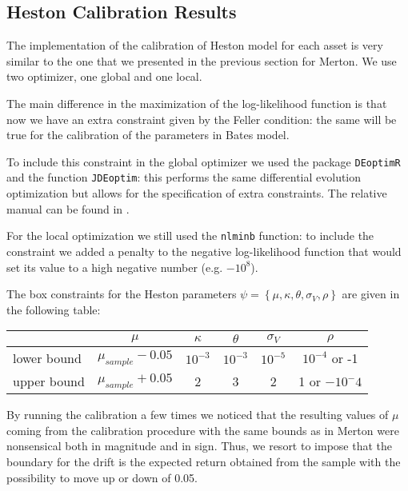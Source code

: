 \subsection{Heston Calibration Results}

The implementation of the calibration of Heston model for each asset is very similar to the one that we presented in the previous section for Merton. We use two optimizer, one global and one local.

The main difference in the maximization of the log-likelihood function is that now we have an extra constraint given by the Feller condition: the same will be true for the calibration of the parameters in Bates model.

To include this constraint in the global optimizer we used the package \texttt{DEoptimR} and the function \texttt{JDEoptim}: this performs the same differential evolution optimization but allows for the specification of extra constraints. The relative manual can be found in \citep{DEoptimR_manual}.

For the local optimization we still used the \texttt{nlminb} function: to include the constraint we added a penalty to the negative log-likelihood function that would set its value to a high negative number (e.g. $-10^8$).

The box constraints for the Heston parameters $\psi =  \left\{ \mu, \kappa, \theta, \sigma_V, \rho \right\}$ are given in the following table:

\bigskip

\begin{center}
	\begin{tabular}{lccccc}
		&$\mu$ & $\kappa$ & $\theta$ & $\sigma_V$ & $\rho$ \\
		\midrule
		lower bound & $\mu_{sample}-0.05$ & $10^{-3}$ & $10^{-3}$ &$10^{-5}$ &$10^{-4}$ or -1\\
		upper bound & $\mu_{sample}+0.05 $& 2 & 3 & 2& 1 or $-10^-4$ \\
		\midrule
	\end{tabular}
\end{center}

\bigskip

By running the calibration a few times we noticed that the resulting values of $\mu$ coming from the calibration procedure with the same bounds as in Merton were nonsensical both in magnitude and in sign. Thus, we resort to impose that the boundary for the drift is the expected return obtained from the sample with the possibility to move up or down of 0.05.

